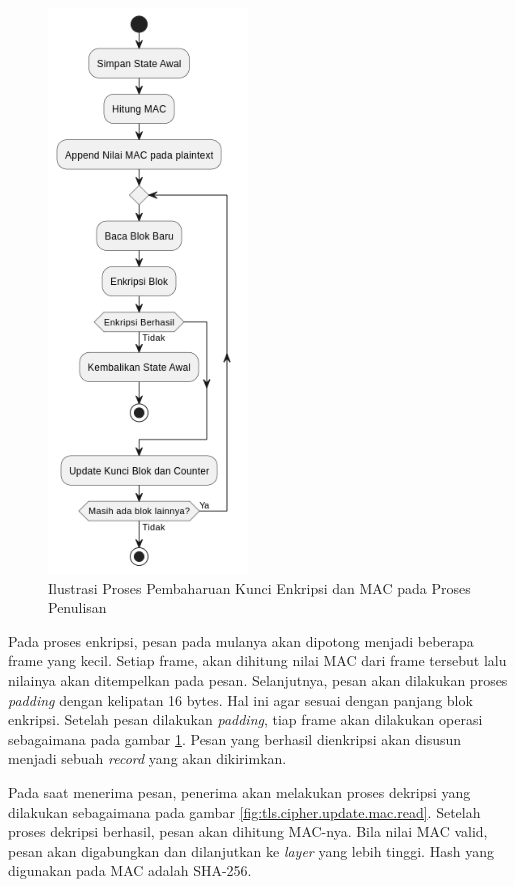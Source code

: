 \begin{figure}[!h]
  \centering
  \includegraphics[width=200px]{chapters/res/chapter-3/img/update.read.png}
  \caption{Ilustrasi Proses Pembaharuan Kunci Enkripsi dan MAC pada Proses Penulisan} \label{fig:tls.cipher.update.mac.write}
\end{figure}

Pada proses enkripsi, pesan pada mulanya akan dipotong menjadi beberapa frame yang kecil. Setiap frame, akan dihitung nilai MAC dari frame tersebut lalu nilainya akan ditempelkan pada pesan. Selanjutnya, pesan akan dilakukan proses \emph{padding} dengan kelipatan 16 bytes. Hal ini agar sesuai dengan panjang blok enkripsi. Setelah pesan dilakukan \emph{padding}, tiap frame akan dilakukan operasi sebagaimana pada gambar \ref{fig:tls.cipher.update.mac.write}. Pesan yang berhasil dienkripsi akan disusun menjadi sebuah \emph{record} yang akan dikirimkan.

Pada saat menerima pesan, penerima akan melakukan proses dekripsi yang dilakukan sebagaimana pada gambar \ref{fig:tls.cipher.update.mac.read}. Setelah proses dekripsi berhasil, pesan akan dihitung MAC-nya. Bila nilai MAC valid, pesan akan digabungkan dan dilanjutkan ke \emph{layer} yang lebih tinggi. Hash yang digunakan pada MAC adalah SHA-256.

